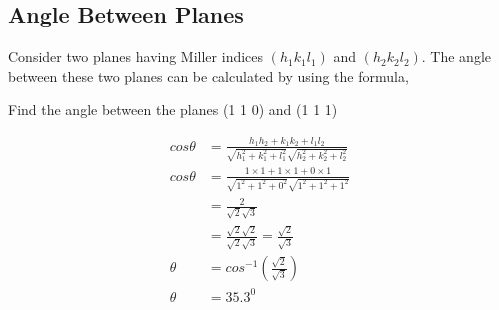 \subsection{Angle Between Planes}
Consider two planes having Miller indices $(h_{1} k_{1} l_{1})$ and $(h_{2} k_{2} l_{2})$. The angle between these two planes can be calculated by using the formula,

\begin{center}
\end{center}

\begin{exercise}
	Find the angle between the planes (1 1 0) and (1 1 1)
\end{exercise}
\begin{answer}
	\begin{align*}
	cos \theta &= \frac{h_{1}h_{2}+k_{1}k_{2}+l_{1}l_{2}}{\sqrt{h_{1}^{2}+k_{1}^{2}+l_{1}^{2}}\sqrt{h_{2}^{2}+k_{2}^{2}+l_{2}^{2}}}\\
	cos \theta &=\frac{1\times 1+ 1\times 1 +0 \times 1}{\sqrt{1^{2}+1^{2}+0^{2}}\sqrt{1^{2}+1^{2}+1^{2}}}\\
	&=\frac{2}{\sqrt{2}\sqrt{3}}\\
	&=\frac{\sqrt{2}\sqrt{2}}{\sqrt{2}\sqrt{3}}= \frac{\sqrt{2}}{\sqrt{3}}\\
	\theta &= cos^{-1} \left( \frac{\sqrt{2}}{\sqrt{3}}\right) \\
	\theta &= 35.3^{0}
	\end{align*}
\end{answer}
